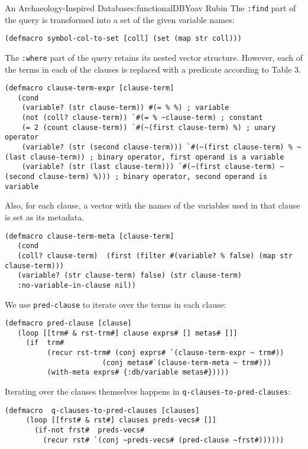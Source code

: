 \begin{aosachapter}{An Archaeology-Inspired Database}{s:functionalDB}{Yoav Rubin}
The \texttt{:find} part of the query is transformed into a set of the
given variable names:

\begin{verbatim}
(defmacro symbol-col-to-set [coll] (set (map str coll)))
\end{verbatim}

The \texttt{:where} part of the query retains its nested vector
structure. However, each of the terms in each of the clauses is replaced
with a predicate according to Table 3.

\begin{verbatim}
(defmacro clause-term-expr [clause-term]
   (cond
    (variable? (str clause-term)) #(= % %) ; variable
    (not (coll? clause-term)) `#(= % ~clause-term) ; constant
    (= 2 (count clause-term)) `#(~(first clause-term) %) ; unary operator
    (variable? (str (second clause-term))) `#(~(first clause-term) % ~(last clause-term)) ; binary operator, first operand is a variable
    (variable? (str (last clause-term))) `#(~(first clause-term) ~(second clause-term) %))) ; binary operator, second operand is variable
\end{verbatim}

Also, for each clause, a vector with the names of the variables used in
that clause is set as its metadata.

\begin{verbatim}
(defmacro clause-term-meta [clause-term]
   (cond
   (coll? clause-term)  (first (filter #(variable? % false) (map str clause-term))) 
   (variable? (str clause-term) false) (str clause-term) 
   :no-variable-in-clause nil))
\end{verbatim}

We use \texttt{pred-clause} to iterate over the terms in each clause:

\begin{verbatim}
(defmacro pred-clause [clause]
   (loop [[trm# & rst-trm#] clause exprs# [] metas# []]
     (if  trm#
          (recur rst-trm# (conj exprs# `(clause-term-expr ~ trm#)) 
                       (conj metas#`(clause-term-meta ~ trm#)))
          (with-meta exprs# {:db/variable metas#}))))
\end{verbatim}

Iterating over the clauses themselves happens in
\texttt{q-clauses-to-pred-clauses}:

\begin{verbatim}
(defmacro  q-clauses-to-pred-clauses [clauses]
     (loop [[frst# & rst#] clauses preds-vecs# []]
       (if-not frst#  preds-vecs#
         (recur rst# `(conj ~preds-vecs# (pred-clause ~frst#))))))
\end{verbatim}


\end{aosachapter}
